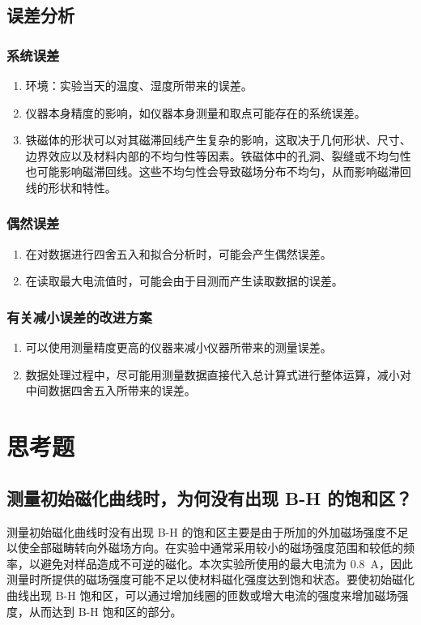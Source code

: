 \documentclass[a4paper,utf8]{article}
\begin{document}
\subsection{误差分析}
\subsubsection{系统误差}
\begin{enumerate}
    \item 环境：实验当天的温度、湿度所带来的误差。
    \item 仪器本身精度的影响，如仪器本身测量和取点可能存在的系统误差。
    \item 铁磁体的形状可以对其磁滞回线产生复杂的影响，这取决于几何形状、尺寸、边界效应以及材料内部的不均匀性等因素。铁磁体中的孔洞、裂缝或不均匀性也可能影响磁滞回线。这些不均匀性会导致磁场分布不均匀，从而影响磁滞回线的形状和特性。
\end{enumerate}
\subsubsection{偶然误差}
\begin{enumerate}
    \item 在对数据进行四舍五入和拟合分析时，可能会产生偶然误差。
    \item 在读取最大电流值时，可能会由于目测而产生读取数据的误差。
\end{enumerate}
\subsubsection{有关减小误差的改进方案}
\begin{enumerate}
    \item 可以使用测量精度更高的仪器来减小仪器所带来的测量误差。
    \item 数据处理过程中，尽可能用测量数据直接代入总计算式进行整体运算，减小对中间数据四舍五入所带来的误差。
\end{enumerate}
\section{思考题}
\subsection{测量初始磁化曲线时，为何没有出现 B-H 的饱和区？}
测量初始磁化曲线时没有出现 B-H 的饱和区主要是由于所加的外加磁场强度不足以使全部磁畴转向外磁场方向。在实验中通常采用较小的磁场强度范围和较低的频率，以避免对样品造成不可逆的磁化。本次实验所使用的最大电流为 \SI{0.8}{\A}，因此测量时所提供的磁场强度可能不足以使材料磁化强度达到饱和状态。要使初始磁化曲线出现 B-H 饱和区，可以通过增加线圈的匝数或增大电流的强度来增加磁场强度，从而达到 B-H 饱和区的部分。
\end{document}
